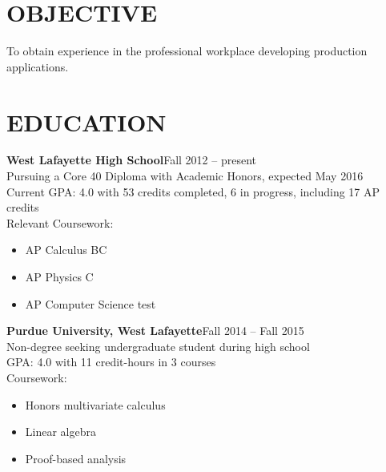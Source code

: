 \documentclass[line,margin]{res}
\begin{document}
\begin{resume}

  \section{OBJECTIVE}
  To obtain experience in the professional workplace developing production applications.


  \section{EDUCATION}
  {\bf\rmfamily West Lafayette High School}\hfill Fall 2012 -- present\\
  Pursuing a Core 40 Diploma with Academic Honors, expected May 2016\\
  Current GPA: 4.0 with 53 credits completed, 6 in progress, including 17 AP credits\\
  Relevant Coursework:
  \multicolsep 0pt
  \begin{multicols}{2}
  \begin{itemize} \itemsep -2pt\RaggedRight
  \item AP Calculus BC
  \item AP Physics C
    \columnbreak
  \item AP Computer Science test
  \end{itemize}
  \end{multicols}

  {\bf\rmfamily Purdue University, West Lafayette}\hfill Fall 2014 -- Fall 2015\\
  Non-degree seeking undergraduate student during high school\\
  GPA: 4.0 with 11 credit-hours in 3 courses \\
  Coursework:
  \multicolsep 0pt
  \begin{multicols}{2}
  \begin{itemize} \itemsep -2pt
  \item Honors multivariate calculus
  \item Linear algebra
  \item Proof-based analysis
  \end{itemize}
  \end{multicols}




\end{resume}
\end{document}
